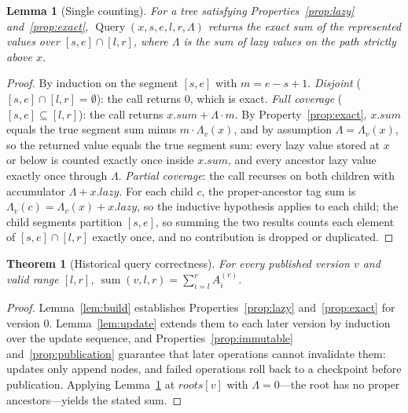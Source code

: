 \documentclass[conference]{IEEEtran}
\newtheorem{lemma}{Lemma}
\newtheorem{theorem}{Theorem}
\begin{document}
\begin{lemma}[Single counting]
\label{lem:query}
For a tree satisfying Properties~\ref{prop:lazy} and~\ref{prop:exact},
$\operatorname{Query}(x, s, e, l, r, \Lambda)$ returns the exact sum of the represented values over
$[s,e] \cap [l,r]$, where $\Lambda$ is the sum of lazy values on the path strictly above $x$.
\end{lemma}

\begin{proof}
By induction on the segment $[s,e]$ with $m = e - s + 1$. \emph{Disjoint}
($[s,e] \cap [l,r] = \emptyset$): the call returns $0$, which is exact. \emph{Full coverage}
($[s,e] \subseteq [l,r]$): the call returns $x.\textit{sum} + \Lambda \cdot m$. By
Property~\ref{prop:exact}, $x.\textit{sum}$ equals the true segment sum minus
$m \cdot \Lambda_v(x)$, and by assumption $\Lambda = \Lambda_v(x)$, so the returned value equals
the true segment sum: every lazy value stored at $x$ or below is counted exactly once inside
$x.\textit{sum}$, and every ancestor lazy value exactly once through $\Lambda$.
\emph{Partial coverage}: the call recurses on both children with accumulator
$\Lambda + x.\textit{lazy}$. For each child $c$, the proper-ancestor tag sum is
$\Lambda_v(c) = \Lambda_v(x) + x.\textit{lazy}$, so the inductive hypothesis applies to each
child; the child segments partition $[s,e]$, so summing the two results counts each element of
$[s,e] \cap [l,r]$ exactly once, and no contribution is dropped or duplicated.
\end{proof}

\begin{theorem}[Historical query correctness]
\label{thm:correct}
For every published version $v$ and valid range $[l,r]$,
$\operatorname{sum}(v, l, r) = \sum_{i=l}^{r} A^{(v)}_i$.
\end{theorem}

\begin{proof}
Lemma~\ref{lem:build} establishes Properties~\ref{prop:lazy} and~\ref{prop:exact} for version 0.
Lemma~\ref{lem:update} extends them to each later version by induction over the update sequence,
and Properties~\ref{prop:immutable} and~\ref{prop:publication} guarantee that later operations
cannot invalidate them: updates only append nodes, and failed operations roll back to a
checkpoint before publication. Applying Lemma~\ref{lem:query} at $\textit{roots}[v]$ with
$\Lambda = 0$---the root has no proper ancestors---yields the stated sum.
\end{proof}
\end{document}

